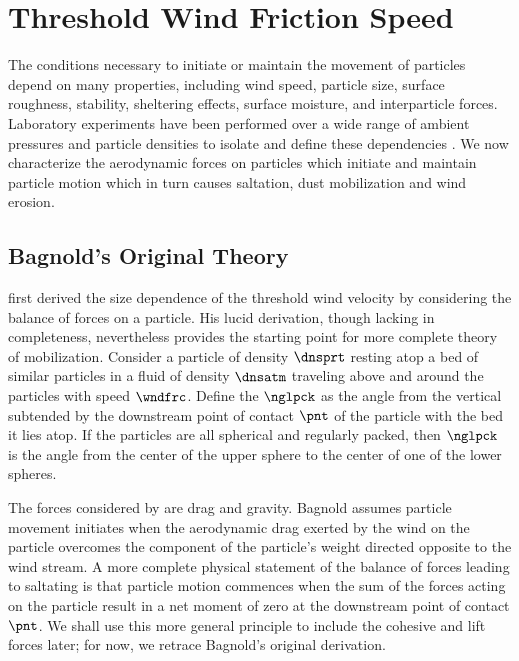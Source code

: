 \documentclass[12pt,twoside]{book}
\begin{document}
\section{Threshold Wind Friction Speed}\label{sxn:wnd_frc_thr}
The conditions necessary to initiate or maintain the movement of
particles depend on many properties, including wind speed, particle
size, surface roughness, stability, sheltering effects, surface
moisture, and interparticle forces.
Laboratory experiments have been performed over a wide range of
ambient pressures and particle densities to isolate and define these
dependencies \cite[]{IvW82,SRL96}.
We now characterize the aerodynamic forces on particles which
initiate and maintain particle motion which in turn causes saltation, 
dust mobilization and wind erosion.

\subsection[Bagnold's Original Theory]{Bagnold's Original Theory}\label{sxn:thr_Bag41}
\cite{Bag41} first derived the size dependence of the threshold wind
velocity by considering the balance of forces on a particle.
His lucid derivation, though lacking in completeness, nevertheless
provides the starting point for more complete theory of mobilization.
Consider a particle of density $\dnsprt$ resting atop a bed of similar
particles in a fluid of density $\dnsatm$ traveling above and around
the particles with speed $\wndfrc$. 
Define the  $\nglpck$ as the angle from the
vertical subtended by the downstream point of contact $\pnt$ of the
particle with the bed it lies atop.
If the particles are all spherical and regularly packed, then $\nglpck$
is the angle from the center of the upper sphere to the center of one
of the lower spheres.

The forces considered by \cite{Bag41} are drag and gravity.
Bagnold assumes particle movement initiates when the aerodynamic
drag exerted by the wind on the particle overcomes the component of the
particle's weight directed opposite to the wind stream.
A more complete physical statement of the balance of forces leading to
saltating is that particle motion commences when the sum of the
forces acting on the particle result in a net moment of zero at the
downstream point of contact $\pnt$. 
We shall use this more general principle to include the cohesive and
lift forces later; for now, we retrace Bagnold's original derivation.
\end{document}
